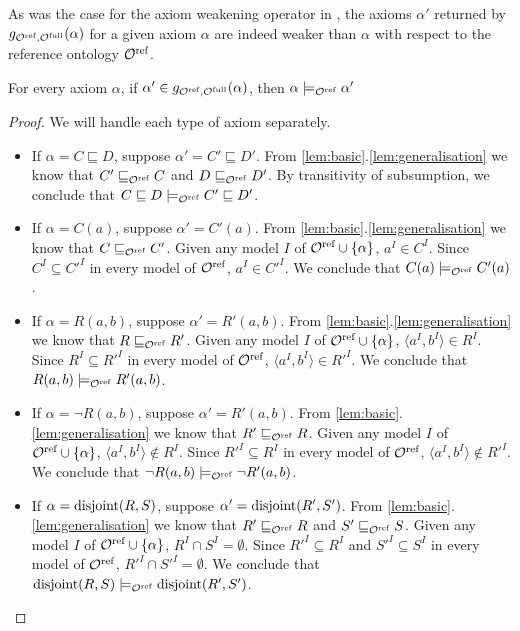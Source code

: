 As was the case for the axiom weakening operator in \ALC, the axioms $\alpha'$ returned by $g_{{\mathcal{O}^\textnormal{ref}},{\mathcal{O}^\textnormal{full}}}(\alpha)$ for a given axiom $\alpha$ are indeed weaker than $\alpha$ with respect to the reference ontology ${\mathcal{O}^\textnormal{ref}}$.

\begin{lemma} \label{lem:weaker}
  For every \SROIQ axiom $\alpha$, if $\alpha' \in g_{{\mathcal{O}^\textnormal{ref}},{\mathcal{O}^\textnormal{full}}}(\alpha)$, then $\alpha \models_{\mathcal{O}^\textnormal{ref}} \alpha'$
\end{lemma}

\begin{proof} We will handle each type of axiom separately.
  \begin{itemize}
    \item If $\alpha = C \sqsubseteq D$, suppose $\alpha' = C' \sqsubseteq D'$. From \cref{lem:basic}.\ref{lem:generalisation} we know that $C' \sqsubseteq_{\mathcal{O}^\textnormal{ref}} C$ and $D \sqsubseteq_{\mathcal{O}^\textnormal{ref}} D'$. By transitivity of subsumption, we conclude that $C \sqsubseteq D \models_{\mathcal{O}^\textnormal{ref}} C' \sqsubseteq D'$.
    \item If $\alpha = C(a)$, suppose $\alpha' = C'(a)$. From \cref{lem:basic}.\ref{lem:generalisation} we know that $C \sqsubseteq_{\mathcal{O}^\textnormal{ref}} C'$. Given any model $I$ of ${\mathcal{O}^\textnormal{ref}} \cup \{ \alpha \}$, $a^I \in C^I$. Since $C^I \subseteq C'^I$ in every model of ${\mathcal{O}^\textnormal{ref}}$, $a^I \in C'^I$. We conclude that $C(a) \models_{\mathcal{O}^\textnormal{ref}} C'(a)$.
    \item If $\alpha = R(a, b)$, suppose $\alpha' = R'(a, b)$. From \cref{lem:basic}.\ref{lem:generalisation} we know that $R \sqsubseteq_{\mathcal{O}^\textnormal{ref}} R'$. Given any model $I$ of ${\mathcal{O}^\textnormal{ref}} \cup \{ \alpha \}$, $\langle a^I, b^I \rangle \in R^I$. Since $R^I \subseteq R'^I$ in every model of ${\mathcal{O}^\textnormal{ref}}$, $\langle a^I, b^I \rangle \in R'^I$. We conclude that $R(a, b) \models_{\mathcal{O}^\textnormal{ref}} R'(a, b)$.
    \item If $\alpha = \lnot R(a, b)$, suppose $\alpha' = R'(a, b)$. From \cref{lem:basic}.\ref{lem:generalisation} we know that $R' \sqsubseteq_{\mathcal{O}^\textnormal{ref}} R$. Given any model $I$ of ${\mathcal{O}^\textnormal{ref}} \cup \{ \alpha \}$, $\langle a^I, b^I \rangle \not\in R^I$. Since $R'^I \subseteq R^I$ in every model of ${\mathcal{O}^\textnormal{ref}}$, $\langle a^I, b^I \rangle \not\in R'^I$. We conclude that $\lnot R(a, b) \models_{\mathcal{O}^\textnormal{ref}} \lnot R'(a, b)$.
    \item If $\alpha = \operatorname{disjoint}(R, S)$, suppose $\alpha' = \operatorname{disjoint}(R', S')$. From \cref{lem:basic}.\ref{lem:generalisation} we know that $R' \sqsubseteq_{\mathcal{O}^\textnormal{ref}} R$ and $S' \sqsubseteq_{\mathcal{O}^\textnormal{ref}} S$. Given any model $I$ of ${\mathcal{O}^\textnormal{ref}} \cup \{ \alpha \}$, $R^I \cap S^I = \emptyset$. Since $R'^I \subseteq R^I$ and $S'^I \subseteq S^I$ in every model of ${\mathcal{O}^\textnormal{ref}}$, $R'^I \cap S'^I = \emptyset$. We conclude that $\operatorname{disjoint}(R, S) \models_{\mathcal{O}^\textnormal{ref}} \operatorname{disjoint}(R', S')$.

\end{itemize}
\end{proof}
